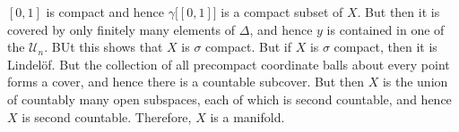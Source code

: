 \documentclass{article}                                                        %
\begin{document}
\begin{solution}
            $[0,1]$ is compact and hence $\gamma\big[[0,1]\big]$ is a compact
            subset of $X$. But then it is covered by only finitely many elements
            of $\Delta$, and hence $y$ is contained in one of the
            $\mathcal{U}_{n}$. BUt this shows that $X$ is $\sigma$ compact. But
            if $X$ is $\sigma$ compact, then it is Lindel\"{o}f. But the
            collection of all precompact coordinate balls about every point
            forms a cover, and hence there is a countable subcover. But then
            $X$ is the union of countably many open subspaces, each of which
            is second countable, and hence $X$ is second countable. Therefore,
            $X$ is a manifold.
        \end{solution}
\end{document}

